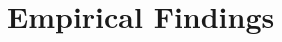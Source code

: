 \documentclass[12pt,letterpaper]{article}
\begin{document}
% 
% 
% 

\section{Empirical Findings}\label{ef} %



% 


% 


\end{document}
